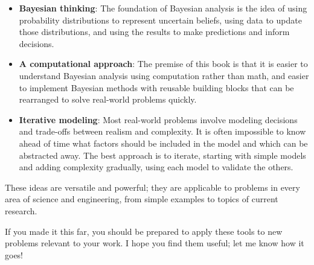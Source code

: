 \documentclass[12pt]{book}
\begin{document}
\begin{itemize}

\item {\bf Bayesian thinking}: The foundation of Bayesian analysis is
  the idea of using probability distributions to represent uncertain
  beliefs, using data to update those distributions, and using the
  results to make predictions and inform decisions.

\item {\bf A computational approach}: The premise of this book is that
  it is easier to understand Bayesian analysis using computation
  rather than math, and easier to implement Bayesian methods with
  reusable building blocks that can be rearranged to solve real-world
  problems quickly.

\item {\bf Iterative modeling}: Most real-world problems involve
  modeling decisions and trade-offs between realism and complexity.
  It is often impossible to know ahead of time what factors should be
  included in the model and which can be abstracted away.  The best
  approach is to iterate, starting with simple models and adding
  complexity gradually, using each model to validate the others.

\end{itemize}

These ideas are versatile and powerful; they are applicable to
problems in every area of science and engineering, from simple
examples to topics of current research.

If you made it this far, you should be prepared to apply these
tools to new problems relevant to your work.  I hope you find
them useful; let me know how it goes!











\end{document}

